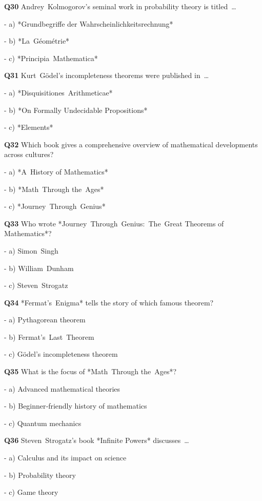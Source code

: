\textbf{Q30} Andrey Kolmogorov's seminal work in probability theory is titled …\par
\quad - a) *Grundbegriffe der Wahrscheinlichkeitsrechnung*\par
\quad - b) *La Géométrie*\par
\quad - c) *Principia Mathematica*\par

\textbf{Q31} Kurt Gödel's incompleteness theorems were published in …\par
\quad - a) *Disquisitiones Arithmeticae*\par
\quad - b) *On Formally Undecidable Propositions*\par
\quad - c) *Elements*\par

\textbf{Q32} Which book gives a comprehensive overview of mathematical developments across cultures?\par
\quad - a) *A History of Mathematics*\par
\quad - b) *Math Through the Ages*\par
\quad - c) *Journey Through Genius*\par

\textbf{Q33} Who wrote *Journey Through Genius: The Great Theorems of Mathematics*?\par
\quad - a) Simon Singh\par
\quad - b) William Dunham\par
\quad - c) Steven Strogatz\par

\textbf{Q34} *Fermat's Enigma* tells the story of which famous theorem?\par
\quad - a) Pythagorean theorem\par
\quad - b) Fermat's Last Theorem\par
\quad - c) Gödel's incompleteness theorem\par

\textbf{Q35} What is the focus of *Math Through the Ages*?\par
\quad - a) Advanced mathematical theories\par
\quad - b) Beginner‑friendly history of mathematics\par
\quad - c) Quantum mechanics\par

\textbf{Q36} Steven Strogatz's book *Infinite Powers* discusses …\par
\quad - a) Calculus and its impact on science\par
\quad - b) Probability theory\par
\quad - c) Game theory\par

